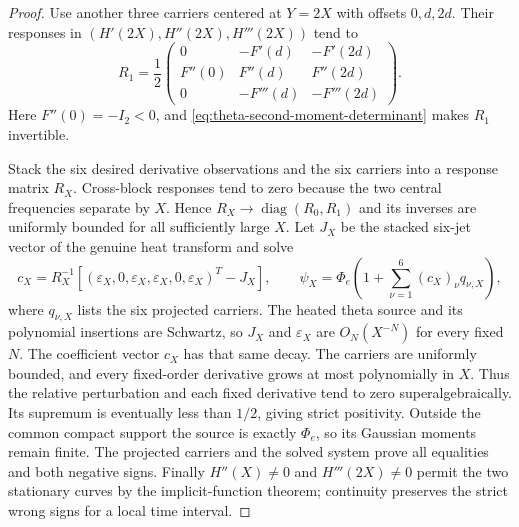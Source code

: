 \documentclass[11pt]{article}
\numberwithin{equation}{section}
\theoremstyle{definition}
\theoremstyle{remark}
\begin{document}
\begin{proof}
Use another three carriers centered at $Y=2X$ with offsets $0,d,2d$.
Their responses in $(H'(2X),H''(2X),H'''(2X))$ tend to
\begin{equation}
 R_1=\frac12
 \begin{pmatrix}
 0&-F'(d)&-F'(2d)\\
 F''(0)&F''(d)&F''(2d)\\
 0&-F'''(d)&-F'''(2d)
 \end{pmatrix}.
 \label{eq:theta-three-carrier-j1}
\end{equation}
Here $F''(0)=-I_2<0$, and
\eqref{eq:theta-second-moment-determinant} makes $R_1$ invertible.

Stack the six desired derivative observations and the six carriers
into a response matrix $R_X$.  Cross-block responses tend to zero
because the two central frequencies separate by $X$.  Hence
$R_X\to\operatorname{diag}(R_0,R_1)$ and its inverses are uniformly
bounded for all sufficiently large $X$.  Let $J_X$ be the stacked
six-jet vector of the genuine heat transform and solve
\begin{equation}
 c_X=R_X^{-1}
 \left[
 (\varepsilon_X,0,\varepsilon_X,
                  \varepsilon_X,0,\varepsilon_X)^T-J_X
 \right],\qquad
 \psi_X=\Phi_e\left(1+\sum_{\nu=1}^6(c_X)_\nu q_{\nu,X}\right),
 \label{eq:theta-six-carrier-solution}
\end{equation}
where $q_{\nu,X}$ lists the six projected carriers.  The heated theta
source and its polynomial insertions are Schwartz, so $J_X$ and
$\varepsilon_X$ are $O_N(X^{-N})$ for every fixed $N$.  The coefficient
vector $c_X$ has that same decay.  The carriers are uniformly bounded,
and every fixed-order derivative grows at most polynomially in $X$.
Thus the relative perturbation and each fixed derivative tend to zero
superalgebraically.  Its supremum is eventually less than $1/2$,
giving strict positivity.  Outside the common compact support the
source is exactly $\Phi_e$, so its Gaussian moments remain finite.
The projected carriers and the solved system prove all equalities and
both negative signs.  Finally $H''(X)\ne0$ and $H'''(2X)\ne0$ permit
the two stationary curves by the implicit-function theorem; continuity
preserves the strict wrong signs for a local time interval.
\end{proof}
\end{document}
